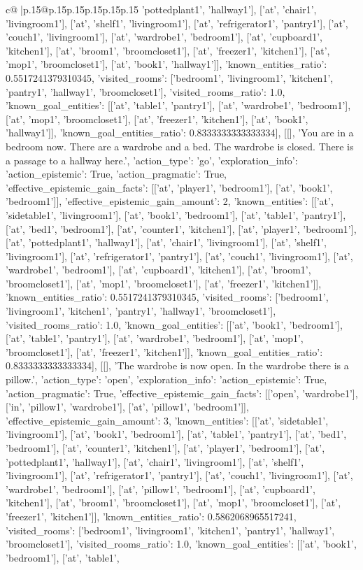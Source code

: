 \documentclass{article}
\begin{document}
{\begin{supertabular}{c@{$\;$}|p{.15\linewidth}@{}p{.15\linewidth}p{.15\linewidth}p{.15\linewidth}p{.15\linewidth}p{.15\linewidth}}
{{{'pottedplant1', 'hallway1'], ['at', 'chair1', 'livingroom1'], ['at', 'shelf1', 'livingroom1'], ['at', 'refrigerator1', 'pantry1'], ['at', 'couch1', 'livingroom1'], ['at', 'wardrobe1', 'bedroom1'], ['at', 'cupboard1', 'kitchen1'], ['at', 'broom1', 'broomcloset1'], ['at', 'freezer1', 'kitchen1'], ['at', 'mop1', 'broomcloset1'], ['at', 'book1', 'hallway1']], 'known_entities_ratio': 0.5517241379310345, 'visited_rooms': ['bedroom1', 'livingroom1', 'kitchen1', 'pantry1', 'hallway1', 'broomcloset1'], 'visited_rooms_ratio': 1.0, 'known_goal_entities': [['at', 'table1', 'pantry1'], ['at', 'wardrobe1', 'bedroom1'], ['at', 'mop1', 'broomcloset1'], ['at', 'freezer1', 'kitchen1'], ['at', 'book1', 'hallway1']], 'known_goal_entities_ratio': 0.8333333333333334}}], [[], 'You are in a bedroom now. There are a wardrobe and a bed. The wardrobe is closed. There is a passage to a hallway here.', {'action_type': 'go', 'exploration_info': {'action_epistemic': True, 'action_pragmatic': True, 'effective_epistemic_gain_facts': [['at', 'player1', 'bedroom1'], ['at', 'book1', 'bedroom1']], 'effective_epistemic_gain_amount': 2, 'known_entities': [['at', 'sidetable1', 'livingroom1'], ['at', 'book1', 'bedroom1'], ['at', 'table1', 'pantry1'], ['at', 'bed1', 'bedroom1'], ['at', 'counter1', 'kitchen1'], ['at', 'player1', 'bedroom1'], ['at', 'pottedplant1', 'hallway1'], ['at', 'chair1', 'livingroom1'], ['at', 'shelf1', 'livingroom1'], ['at', 'refrigerator1', 'pantry1'], ['at', 'couch1', 'livingroom1'], ['at', 'wardrobe1', 'bedroom1'], ['at', 'cupboard1', 'kitchen1'], ['at', 'broom1', 'broomcloset1'], ['at', 'mop1', 'broomcloset1'], ['at', 'freezer1', 'kitchen1']], 'known_entities_ratio': 0.5517241379310345, 'visited_rooms': ['bedroom1', 'livingroom1', 'kitchen1', 'pantry1', 'hallway1', 'broomcloset1'], 'visited_rooms_ratio': 1.0, 'known_goal_entities': [['at', 'book1', 'bedroom1'], ['at', 'table1', 'pantry1'], ['at', 'wardrobe1', 'bedroom1'], ['at', 'mop1', 'broomcloset1'], ['at', 'freezer1', 'kitchen1']], 'known_goal_entities_ratio': 0.8333333333333334}}], [[], 'The wardrobe is now open. In the wardrobe there is a pillow.', {'action_type': 'open', 'exploration_info': {'action_epistemic': True, 'action_pragmatic': True, 'effective_epistemic_gain_facts': [['open', 'wardrobe1'], ['in', 'pillow1', 'wardrobe1'], ['at', 'pillow1', 'bedroom1']], 'effective_epistemic_gain_amount': 3, 'known_entities': [['at', 'sidetable1', 'livingroom1'], ['at', 'book1', 'bedroom1'], ['at', 'table1', 'pantry1'], ['at', 'bed1', 'bedroom1'], ['at', 'counter1', 'kitchen1'], ['at', 'player1', 'bedroom1'], ['at', 'pottedplant1', 'hallway1'], ['at', 'chair1', 'livingroom1'], ['at', 'shelf1', 'livingroom1'], ['at', 'refrigerator1', 'pantry1'], ['at', 'couch1', 'livingroom1'], ['at', 'wardrobe1', 'bedroom1'], ['at', 'pillow1', 'bedroom1'], ['at', 'cupboard1', 'kitchen1'], ['at', 'broom1', 'broomcloset1'], ['at', 'mop1', 'broomcloset1'], ['at', 'freezer1', 'kitchen1']], 'known_entities_ratio': 0.5862068965517241, 'visited_rooms': ['bedroom1', 'livingroom1', 'kitchen1', 'pantry1', 'hallway1', 'broomcloset1'], 'visited_rooms_ratio': 1.0, 'known_goal_entities': [['at', 'book1', 'bedroom1'], ['at', 'table1', }}}
\end{supertabular}}
\end{document}
